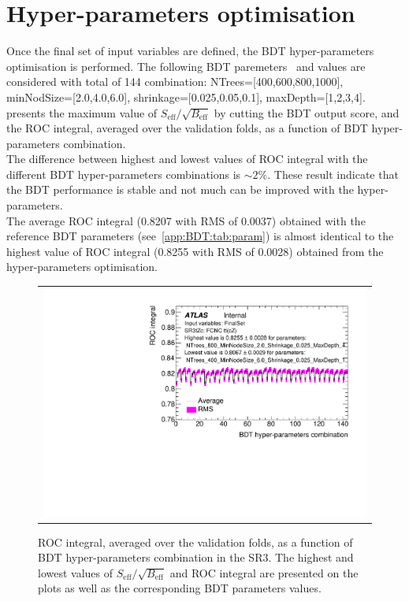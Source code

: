 \section{Hyper-parameters optimisation}
Once the final set of input variables are defined, the BDT hyper-parameters optimisation is performed.
The following BDT paremeters~\cite{TMVA} and values are considered with total of 144 combination:
NTrees=[400,600,800,1000], minNodSize=[2.0,4.0,6.0], shrinkage=[0.025,0.05,0.1], maxDepth=[1,2,3,4].
~ presents the maximum value of $S_{\text{eff}}/\sqrt{B_{\text{eff}}}$ by cutting the BDT output score, and the ROC integral,
averaged over the validation folds, as a function of BDT hyper-parameters combination.\\
The difference between highest and lowest values of ROC integral
with the different BDT hyper-parameters combinations is $\sim2\%$.
These result indicate that the BDT performance is stable and not much can be improved with the hyper-parameters.\\
The average ROC integral (0.8207 with RMS of 0.0037) obtained with the reference BDT parameters (see~\cref{app:BDT:tab:param}) is almost identical to the highest value of ROC integral (0.8255 with RMS of 0.0028) obtained from the hyper-parameters optimisation.

\begin{figure}[!htbp]
	\centering
	\begin{tabular}{c}
		\includegraphics[width=.6\textwidth]{Chapters/CH6/figures/SR3_UsingSMT/BDT/FinalSet/HPO/ROC_integral}
	\end{tabular}
	\caption{ROC integral, averaged over the validation folds,
		as a function of BDT hyper-parameters combination in the SR3. The highest and lowest values of $S_{\text{eff}}/\sqrt{B_{\text{eff}}}$ and ROC integral are presented on the plots as well as
		the corresponding BDT parameters values.}
	\label{app:BDT:fig:SR3:HPO}
\end{figure}


